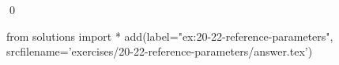 
\begin{ex}
  \label{ex:20-22-reference-parameters}
  
  \qed
\end{ex}
\begin{python0}
from solutions import *
add(label="ex:20-22-reference-parameters",
    srcfilename='exercises/20-22-reference-parameters/answer.tex')
\end{python0}
